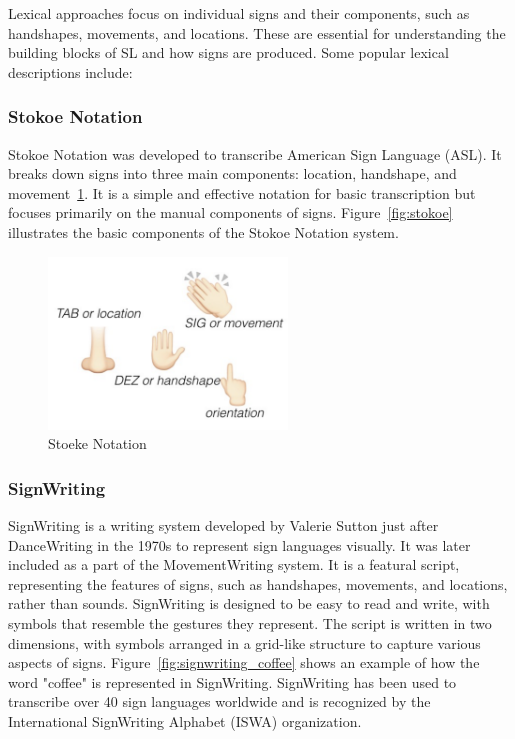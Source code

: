 \documentclass[../../main.tex]{subfiles}
\begin{document}
Lexical approaches focus on individual signs and their components, such as handshapes, movements, and locations. These are essential for understanding the building blocks of SL and how signs are produced. Some popular lexical descriptions include:

\subsubsection{Stokoe Notation}
\label{ch:background_work:sign_language_descriptions:lexical_approaches:stokoe_notation}

Stokoe Notation\cite{stokoe1980sign} was developed to transcribe American Sign Language (ASL). It breaks down signs into three main components: location, handshape, and movement~\ref{fig:stoeke}. It is a simple and effective notation for basic transcription but focuses primarily on the manual components of signs. Figure~\ref{fig:stokoe} illustrates the basic components of the Stokoe Notation system.

\begin{figure}
  \centering \includegraphics[width = 2.5in]{chapters/background_work/images/stokoe.png}
  \caption{Stoeke Notation}
  \label{fig:stoeke}
\end{figure}

\subsubsection{SignWriting}
\label{ch:background_work:sign_language_descriptions:lexical_approaches:signwriting}

SignWriting is a writing system developed by Valerie Sutton just after DanceWriting\cite{sutton1973sutton} in the 1970s to represent sign languages visually. It was later included as a part of the MovementWriting system. It is a featural script, representing the features of signs, such as handshapes, movements, and locations, rather than sounds. SignWriting is designed to be easy to read and write, with symbols that resemble the gestures they represent. The script is written in two dimensions, with symbols arranged in a grid-like structure to capture various aspects of signs. Figure~\ref{fig:signwriting_coffee} shows an example of how the word "coffee" is represented in SignWriting. SignWriting has been used to transcribe over 40 sign languages worldwide and is recognized by the International SignWriting Alphabet (ISWA) organization.
\end{document}

